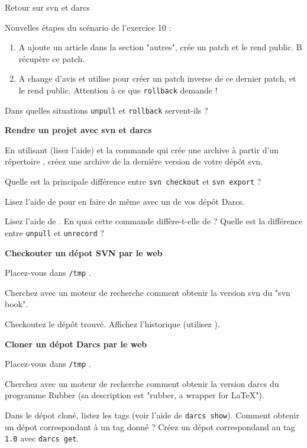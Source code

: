 \documentclass[10pt]{article}\usepackage[nu]{esial}
\begin{document}
\begin{part}{Retour sur svn et darcs}

\begin{Exercice} {\bf }

Nouvelles étapes du scénario de l'exercice 10 :

\begin{enumerate}
\item A ajoute un article dans la section "autres", crée un patch et le rend public.
      B récupère ce patch.
\item A change d'avis et utilise  pour créer
      un patch inverse de ce dernier patch, et le rend public.
      Attention à ce que {\tt rollback} demande !
\end{enumerate}

Dans quelles situations {\tt unpull} et {\tt rollback} servent-ils ?
\end{Exercice}

\begin{Exercice} {\bf Rendre un projet avec svn et darcs}

En utilisant  (lisez l'aide) et la commande 
qui crée une archive  à partir d'un répertoire ,
créez une archive de la dernière version de votre dépôt svn.

Quelle est la principale différence entre {\tt svn checkout} et {\tt svn export} ?

Lisez l'aide de  pour en faire de même avec un de vos dépôt Darcs.
\end{Exercice}

\begin{Exercice}
Lisez l'aide de . En quoi cette commande diffère-t-elle de
 ?
Quelle est la différence entre {\tt unpull} et {\tt unrecord} ?
\end{Exercice}


\begin{Exercice} {\bf Checkouter un dépot SVN par le web}

Placez-vous dans {\tt /tmp} .

Cherchez avec un moteur de recherche comment obtenir la version svn
du "svn book".

Checkoutez le dépôt trouvé. Affichez l'historique (utilisez ).

\end{Exercice}

\begin{Exercice} {\bf Cloner un dépot Darcs par le web}

Placez-vous dans {\tt /tmp} .

Cherchez avec un moteur de recherche comment obtenir la version darcs
du programme Rubber (sa description est "rubber, a wrapper for LaTeX").

Dans le dépot cloné, listez les tags (voir l'aide de {\tt darcs show}).
Comment obtenir un dépot correspondant à un tag donné ?
Créez un dépot correspondand au tag {\tt 1.0} avec {\tt darcs get}.

\end{Exercice}

\end{part}
\end{document}
